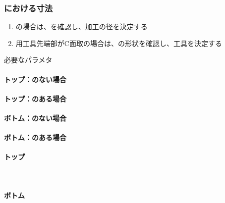 \subsubsection{\EndFaceChamferMilling における寸法}
\begin{enumerate}[label=\sarrow]
\item \EndFaceOutCChamfer の場合は、\OutcutExists を確認し、加工の径を決定する
\item {}\nameOutcut 用工具先端部がC面取の場合は、\nameOutcut の形状を確認し、工具を決定する
\end{enumerate}
\begin{Parameter}{必要なパラメタ}
\paragraph*{トップ\EndFaceOutCChamfer：\Outcut のない場合}
\PMACOD
\PMBDOD
\PMTopEndFaceOutCChamferLength
\PMODCornerR
\tcbline*
\paragraph*{トップ\EndFaceOutCChamfer：\Outcut のある場合}
\PMTopOutcutACWidth
\PMTopOutcutBDWidth
\PMTopOutcutCornerR
\PMTopEndFaceOutCChamferLength
\tcbline*
\paragraph*{ボトム\EndFaceOutCChamfer：\Outcut のない場合}
\PMACOD
\PMBDOD
\PMBottomEndFaceOutCChamferLength
\PMODCornerR
\tcbline*
\paragraph*{ボトム\EndFaceOutCChamfer：\Outcut のある場合}
\PMBottomOutcutACWidth
\PMBottomOutcutBDWidth
\PMBottomOutcutConerR
\PMBottomEndFaceOutCChamferLength
\tcbline*
\paragraph*{トップ\EndFaceInCChamfer}
\PMTopEndACID
\PMTopEndBDID
\PMTopEndIDCornerR\\
\PMTopEndFaceInCChamferLength
\PMPlatingThk
\tcbline*
\paragraph*{ボトム\EndFaceInCChamfer}
\PMBottomEndACID
\PMBottomEndBDID
\PMBottomEndIDCornerR\\
\PMBottomEndFaceInCChamferLength
\PMPlatingThk
\end{Parameter}

